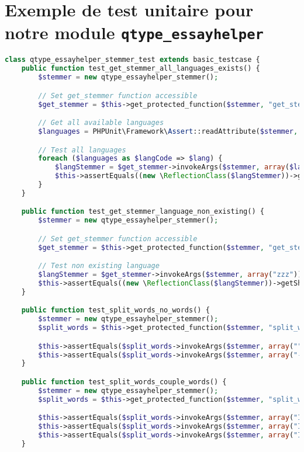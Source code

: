 \chapter{Exemple de test unitaire pour notre module \texttt{qtype\_essayhelper}}
\label{annexe_unittest}

\begin{lstlisting}[language=php,frame=l,style=default]
class qtype_essayhelper_stemmer_test extends basic_testcase {
    public function test_get_stemmer_all_languages_exists() {
        $stemmer = new qtype_essayhelper_stemmer();

        // Set get_stemmer function accessible
        $get_stemmer = $this->get_protected_function($stemmer, "get_stemmer");

        // Get all available languages
        $languages = PHPUnit\Framework\Assert::readAttribute($stemmer, "languages");

        // Test all languages
        foreach ($languages as $langCode => $lang) {
            $langStemmer = $get_stemmer->invokeArgs($stemmer, array($langCode));
            $this->assertEquals((new \ReflectionClass($langStemmer))->getShortName(), $lang);
        }
    }

    public function test_get_stemmer_language_non_existing() {
        $stemmer = new qtype_essayhelper_stemmer();

        // Set get_stemmer function accessible
        $get_stemmer = $this->get_protected_function($stemmer, "get_stemmer");

        // Test non existing language
        $langStemmer = $get_stemmer->invokeArgs($stemmer, array("zzz"));
        $this->assertEquals((new \ReflectionClass($langStemmer))->getShortName(), "English");
    }

    public function test_split_words_no_words() {
        $stemmer = new qtype_essayhelper_stemmer();
        $split_words = $this->get_protected_function($stemmer, "split_words");

        $this->assertEquals($split_words->invokeArgs($stemmer, array("")), array());
        $this->assertEquals($split_words->invokeArgs($stemmer, array("-\n    ' %")), array());
    }

    public function test_split_words_couple_words() {
        $stemmer = new qtype_essayhelper_stemmer();
        $split_words = $this->get_protected_function($stemmer, "split_words");

        $this->assertEquals($split_words->invokeArgs($stemmer, array("I love potatoes")), array("I", "love", "potatoes"));
        $this->assertEquals($split_words->invokeArgs($stemmer, array("I+love+potatoes")), array("I", "love", "potatoes"));
        $this->assertEquals($split_words->invokeArgs($stemmer, array("I-love\npotatoes")), array("I", "love", "potatoes"));
    }


\end{lstlisting}
